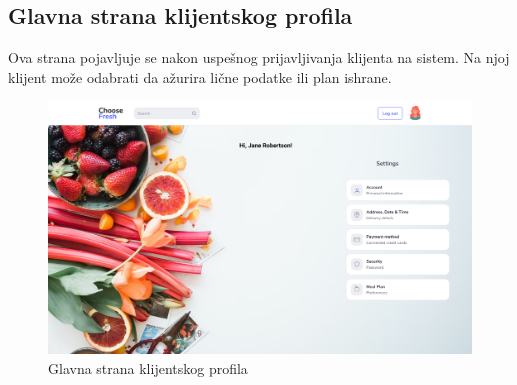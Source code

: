 \subsection{Glavna strana klijentskog profila}

Ova strana pojavljuje se nakon uspešnog prijavljivanja klijenta na sistem. Na njoj klijent može odabrati da ažurira lične podatke ili plan ishrane.

\begin{figure}[H]
	\begin{center}
		\includegraphics[width=\textwidth]{UI/client_home_page.png}
    		\caption{Glavna strana klijentskog profila}
    \label{fig:ClientHomePage}
    \end{center}
\end{figure}